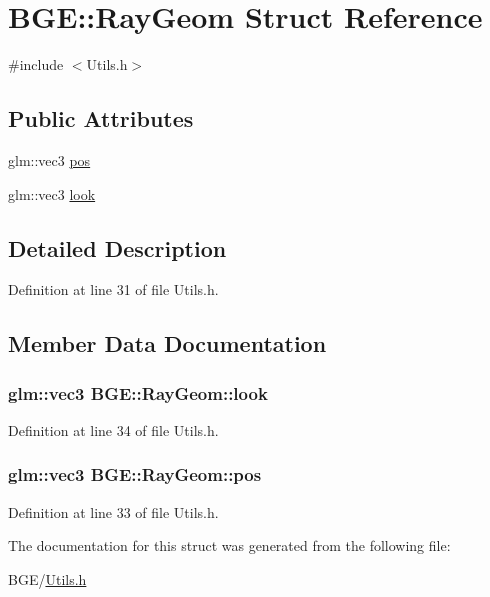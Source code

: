 \hypertarget{struct_b_g_e_1_1_ray_geom}{\section{B\-G\-E\-:\-:Ray\-Geom Struct Reference}
\label{struct_b_g_e_1_1_ray_geom}
}


{\ttfamily \#include $<$Utils.\-h$>$}

\subsection*{Public Attributes}
\begin{DoxyCompactItemize}
\item 
glm\-::vec3 \hyperlink{struct_b_g_e_1_1_ray_geom_a8646af10492332e68346be368616b39c}{pos}
\item 
glm\-::vec3 \hyperlink{struct_b_g_e_1_1_ray_geom_a4eb6f73a1553e0a663b9623d8ba085df}{look}
\end{DoxyCompactItemize}


\subsection{Detailed Description}


Definition at line 31 of file Utils.\-h.



\subsection{Member Data Documentation}
\hypertarget{struct_b_g_e_1_1_ray_geom_a4eb6f73a1553e0a663b9623d8ba085df}{
\subsubsection[{look}]{\setlength{\rightskip}{0pt plus 5cm}glm\-::vec3 B\-G\-E\-::\-Ray\-Geom\-::look}}\label{struct_b_g_e_1_1_ray_geom_a4eb6f73a1553e0a663b9623d8ba085df}


Definition at line 34 of file Utils.\-h.

\hypertarget{struct_b_g_e_1_1_ray_geom_a8646af10492332e68346be368616b39c}{
\subsubsection[{pos}]{\setlength{\rightskip}{0pt plus 5cm}glm\-::vec3 B\-G\-E\-::\-Ray\-Geom\-::pos}}\label{struct_b_g_e_1_1_ray_geom_a8646af10492332e68346be368616b39c}


Definition at line 33 of file Utils.\-h.



The documentation for this struct was generated from the following file\-:\begin{DoxyCompactItemize}
\item 
B\-G\-E/\hyperlink{_utils_8h}{Utils.\-h}\end{DoxyCompactItemize}
